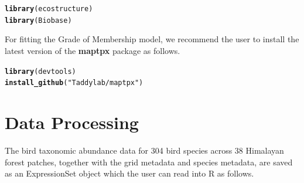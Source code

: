 \documentclass[12pt]{article}\usepackage[]{graphicx}\usepackage[usenames,dvipsnames]{color}
\makeatletter
\newcommand{\hlstr}[1]{\textcolor[rgb]{0.192,0.494,0.8}{#1}}%
\newcommand{\hlstd}[1]{\textcolor[rgb]{0.345,0.345,0.345}{#1}}%
\newcommand{\hlkwd}[1]{\textcolor[rgb]{0.737,0.353,0.396}{\textbf{#1}}}%
\newenvironment{kframe}{%
 \def\at@end@of@kframe{}%
 \ifinner\ifhmode%
  \def\at@end@of@kframe{\end{minipage}}%
  \begin{minipage}{\columnwidth}%
 \fi\fi%
 \def\FrameCommand##1{\hskip\@totalleftmargin \hskip-\fboxsep
 \colorbox{shadecolor}{##1}\hskip-\fboxsep
     \hskip-\linewidth \hskip-\@totalleftmargin \hskip\columnwidth}%
 \MakeFramed {\advance\hsize-\width
   \@totalleftmargin\z@ \linewidth\hsize
   \@setminipage}}%
 {\par\unskip\endMakeFramed%
 \at@end@of@kframe}
\newenvironment{knitrout}{}{} %
\makeatother
\begin{document}
\begin{knitrout}
\color{fgcolor}\begin{kframe}
\begin{alltt}
\hlkwd{library}\hlstd{(ecostructure)}
\hlkwd{library}\hlstd{(Biobase)}
\end{alltt}
\end{kframe}
\end{knitrout}

For fitting the Grade of Membership model, we recommend the user to install the latest version of the \textbf{maptpx} package as follows.

\begin{knitrout}
\color{fgcolor}\begin{kframe}
\begin{alltt}
\hlkwd{library}\hlstd{(devtools)}
\hlkwd{install_github}\hlstd{(}\hlstr{"Taddylab/maptpx"}\hlstd{)}
\end{alltt}
\end{kframe}
\end{knitrout}


\section{Data Processing}

The bird taxonomic abundance data for 304 bird species across 38 Himalayan forest patches, together with the grid metadata and species metadata, are saved as an ExpressionSet object which the user can read into R as follows.
\end{document}

